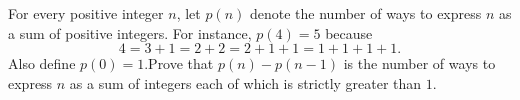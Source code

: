 \documentclass{article}
\begin{document}
\setlength{\parindent}{0pt}
For every positive integer $n$, let $p(n)$ denote the number of ways to express $n$ as a sum of positive integers. For instance, $p(4)=5$ because$$4=3+1=2+2=2+1+1=1+1+1+1.$$Also define $p(0)=1$.\newline Prove that $p(n)-p(n-1)$ is the number of ways to express $n$ as a sum of integers each of which is strictly greater than $1$.
\end{document}
